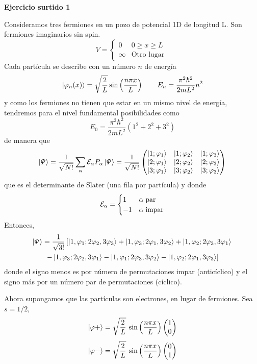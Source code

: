\documentclass[10pt,oneside]{CBFT_book}
\begin{document}
\begin{ejemplo}{\bf Ejercicio surtido 1}
 
Consideramos tres fermiones en un pozo de potencial 1D de longitud L. Son fermiones imaginarios sin spin.
\[
	V = \begin{cases}
	     0      & 0 \geq x \geq L \\
	     \infty & \text{Otro lugar }
	    \end{cases}
\]
Cada partícula se describe con un número $n$ de energía
\[
	\Ket{\varphi_n(x)} = \sqrt{ \frac{2}{L} } \sin\left( \frac{ n\pi x }{ L } \right) \qquad 
	E_n = \frac{\pi^2\hbar^2}{2 m L^2} n^2 
\]
y como los fermiones no tienen que estar en un mismo nivel de energía, tendremos para el nivel
fundamental posibilidades como
\[
	E_0 = \frac{\pi^2\hbar^2}{2 m L^2} ( 1^2 + 2^2 + 3^2 )
\]
de manera que 
\[
	\Ket{\Psi} = \frac{1}{\sqrt{N!}} \sum_{\alpha} \mathcal{E}_\alpha P_\alpha \Ket{\Psi} =
	\frac{1}{\sqrt{N!}}
	\begin{pmatrix}
	\Ket{1;\varphi_1} & \Ket{1;\varphi_2} & \Ket{1;\varphi_3} \\
	\Ket{2;\varphi_1} & \Ket{2;\varphi_2} & \Ket{2;\varphi_3} \\
	\Ket{3;\varphi_1} & \Ket{3;\varphi_2} & \Ket{3;\varphi_3} 
	\end{pmatrix}
\]
que es el determinante de Slater (una fila por partícula) y donde 
\[
	\mathcal{E}_\alpha = \begin{cases}
	 1  & \alpha \; \text{par} \\
	 -1 & \alpha \; \text{impar} 
	\end{cases}
\]
Entonces,
\begin{multline*}
	\Ket{\Psi} = \frac{1}{\sqrt{ 3! }} 
	\left[ 
	\Ket{ 1, \varphi_1 ; 2 \varphi_2, 3 \varphi_3} + \Ket{ 1, \varphi_3 ; 2 \varphi_1, 3 \varphi_2} + 
	\Ket{ 1, \varphi_2 ; 2 \varphi_3, 3 \varphi_1}  \right. \\
	\left. - \Ket{ 1, \varphi_3 ; 2 \varphi_2, 3 \varphi_1} - \Ket{ 1, \varphi_1 ; 2 \varphi_3, 3 \varphi_2} -
	\Ket{ 1, \varphi_2 ; 2 \varphi_1, 3 \varphi_3}
	\right] 
\end{multline*}
donde el signo menos es por número de permutaciones impar (anticíclico) y el signo más por un número
par de permutaciones (cíclico).

Ahora supongamos que las partículas son electrones, en lugar de fermiones. Sea $s=1/2$,
\[
	\Ket{\varphi + } = \sqrt{\frac{2}{L}} \: \sin\left( \frac{ n \pi x }{ L } \right) \begin{pmatrix}
	                                                            1 \\
	                                                            0
	                                                           \end{pmatrix}
\]
\[
	\Ket{\varphi - } = \sqrt{\frac{2}{L}} \: \sin\left( \frac{ n \pi x }{ L } \right) \begin{pmatrix}
	                                                            0 \\
	                                                            1
	                                                           \end{pmatrix}
\] 


\end{ejemplo}
\end{document}
